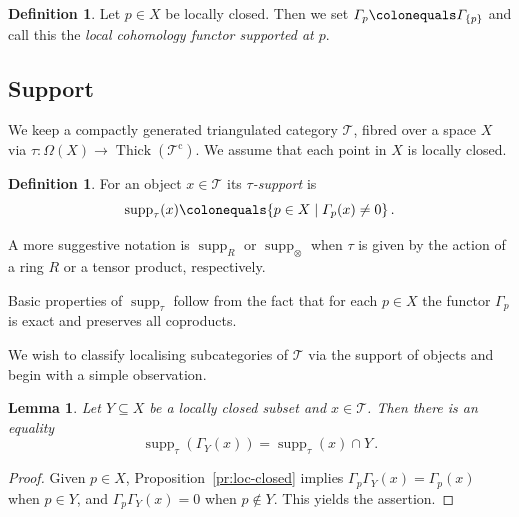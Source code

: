 \documentclass{amsart}[a4]
\newtheorem{lemma}[theorem]{Lemma}
\theoremstyle{definition}
\newtheorem{definition}[theorem]{Definition}
\theoremstyle{remark}
\numberwithin{equation}{section}
\newcommand{\supp}{\operatorname{supp}}
\newcommand{\Thick}{\operatorname{Thick}}
\newcommand{\cat}{\mathcal}
\let\Gamma\varGamma
\let\Omega\varOmega
\begin{document}
\begin{definition}
Let $p\in X$ be locally closed. Then we set $\Gamma_p\colonequals\Gamma_{\{p\}}$
and call this the \emph{local cohomology functor supported at $p$}.
\end{definition}


\subsection*{Support}

We keep a compactly generated triangulated category $\cat T$, fibred
over a space $X$ via $\tau\colon\Omega(X)\to\Thick(\cat T^{\mathrm c})$. We
assume that each point in $X$ is locally closed.

\begin{definition}\label{de:tau-supp}
  For an object $x\in\cat T$ its \emph{$\tau$-support} is
  \[\supp_\tau(x)\colonequals\{p\in X\mid\Gamma_p(x)\neq 0\}\,.\]
\end{definition}

A more suggestive notation is $\supp_R$ or $\supp_\otimes$ when $\tau$ is given by the
action of a ring $R$ or a
tensor product, respectively.

Basic properties of $\supp_\tau$ follow from the fact that for each
$p\in X$ the functor $\Gamma_p$ is exact and preserves all coproducts.

We wish to classify localising subcategories of
$\cat T$ via the support of objects and begin with a simple
observation.

\begin{lemma}\label{le:support-loc-closed}
  Let $Y\subseteq X$ be a locally closed subset and $x\in\cat T$. Then there is an
  equality
  \[\supp_\tau(\Gamma_Y(x))=\supp_\tau(x)\cap Y\,.\]
\end{lemma}
\begin{proof}
  Given $p\in X$, Proposition~\ref{pr:loc-closed} implies
  $\Gamma_p \Gamma_Y(x)=\Gamma_p(x)$ when $p\in Y$, and
  $\Gamma_p \Gamma_Y(x)=0$  when $p\not\in Y$. This yields the assertion.
\end{proof}
\end{document}
